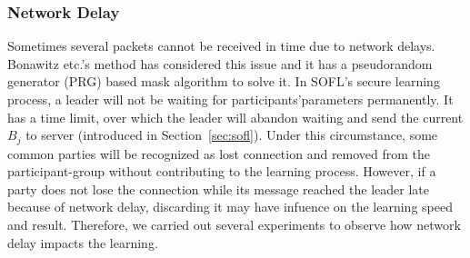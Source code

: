 \subsubsection{Network Delay}
Sometimes several packets cannot be received in time due to network delays. Bonawitz etc.'s method\cite{Practical} has considered this issue and it has a pseudorandom generator (PRG) based mask algorithm to solve it. In SOFL's secure learning process, a leader will not be waiting for participants'parameters permanently. It has a time limit, over which the leader will abandon waiting and send the current $B_j$ to server (introduced in Section~\ref{sec:sofl}). Under this circumstance, some common parties will be recognized as lost connection and removed from the participant-group without contributing to the learning process. However, if a party does not lose the connection while its message reached the leader late because of network delay, discarding it may have infuence on the learning speed and result. Therefore, we carried out several experiments to observe how network delay impacts the learning. 